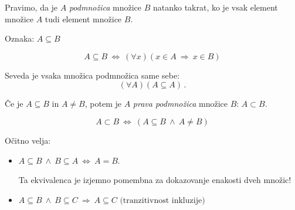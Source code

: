 \documentclass[11pt,paper=b5,footinclude,headinclude]{scrbook} %
\def\ali {{~\vee~}}
\def\inn {{~\wedge~}}
\def\sledi {{~\Rightarrow~}}
\def\cee {{~\Leftrightarrow~}}
\begin{document}
Pravimo, da je $A$ {\em podmnožica} množice $B$ natanko takrat, ko je vsak element množice $A$ tudi element množice $B$.

Oznaka: $A\subseteq B$

$$A\subseteq B\cee (\forall x)(x\in A\sledi x\in B)$$

Seveda je vsaka množica podmnožica same sebe: $$(\forall A)(A\subseteq A)\,.$$

 Če je $A\subseteq B$ in $A\neq B$, potem je $A$ {\em prava podmnožica} množice $B$: $A\subset B$.

$$A\subset B\cee (A\subseteq B \inn A\neq B)$$

Očitno velja:
\begin{itemize}
  \item $A\subseteq B \inn B\subseteq A \cee A = B$.

  Ta ekvivalenca je izjemno pomembna za dokazovanje enakosti dveh množic!
  \item $A\subseteq B \inn B\subseteq C \sledi A \subseteq C \textrm{~(tranzitivnost inkluzije)}$
\end{itemize}


%
%
%
%
%
%
%
%
%
%
%
%
%
%

%
%
\end{document}
